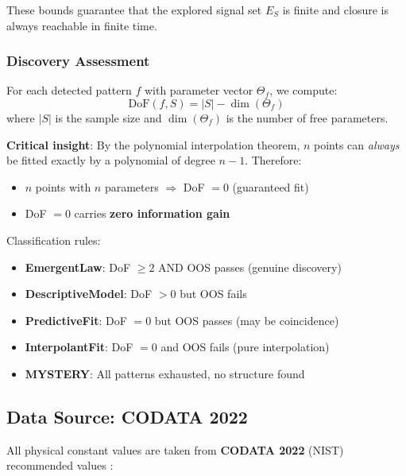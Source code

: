 \documentclass[twocolumn,showpacs,preprintnumbers,amsmath,amssymb,prl]{revtex4-2}
\begin{document}
These bounds guarantee that the explored signal set $E_S$ is finite and closure is always reachable in finite time.

\subsubsection{Discovery Assessment}

For each detected pattern $f$ with parameter vector $\Theta_f$, we compute:
\begin{equation}
    \text{DoF}(f, S) = |S| - \dim(\Theta_f)
\end{equation}
where $|S|$ is the sample size and $\dim(\Theta_f)$ is the number of free parameters.

\textbf{Critical insight}: By the polynomial interpolation theorem, $n$ points can \textit{always} be fitted exactly by a polynomial of degree $n-1$. Therefore:
\begin{itemize}
    \item $n$ points with $n$ parameters $\Rightarrow$ DoF $= 0$ (guaranteed fit)
    \item DoF $= 0$ carries \textbf{zero information gain}
\end{itemize}

Classification rules:
\begin{itemize}
    \item \textbf{EmergentLaw}: DoF $\geq 2$ AND OOS passes (genuine discovery)
    \item \textbf{DescriptiveModel}: DoF $> 0$ but OOS fails
    \item \textbf{PredictiveFit}: DoF $= 0$ but OOS passes (may be coincidence)
    \item \textbf{InterpolantFit}: DoF $= 0$ and OOS fails (pure interpolation)
    \item \textbf{MYSTERY}: All patterns exhausted, no structure found
\end{itemize}

\subsection{Data Source: CODATA 2022}

All physical constant values are taken from \textbf{CODATA 2022} (NIST) recommended values \cite{codata2022}:
\end{document}
